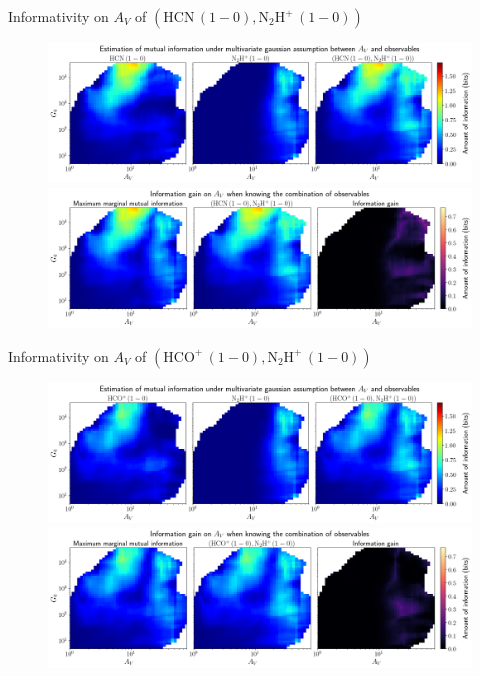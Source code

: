 \documentclass{beamer}
\begin{document}
\begin{frame}{Informativity on $A_V$ of $\left(\mathrm{HCN\,(1-0)},\mathrm{N_2H^+\,(1-0)}\right)$}
    \begin{figure}
        \centering
        \includegraphics[width=0.95\linewidth]{../linearinfogauss/av__hcn10_n2hp10_linearinfogauss.png}
        \vfill
        \includegraphics[width=0.95\linewidth]{../linearinfogauss/av__hcn10_n2hp10_linearinfogauss_gain.png}
    \end{figure}
\end{frame}

\begin{frame}{Informativity on $A_V$ of $\left(\mathrm{HCO^+\,(1-0)},\mathrm{N_2H^+\,(1-0)}\right)$}
    \begin{figure}
        \centering
        \includegraphics[width=0.95\linewidth]{../linearinfogauss/av__hcop10_n2hp10_linearinfogauss.png}
        \vfill
        \includegraphics[width=0.95\linewidth]{../linearinfogauss/av__hcop10_n2hp10_linearinfogauss_gain.png}
    \end{figure}
\end{frame}
\end{document}

